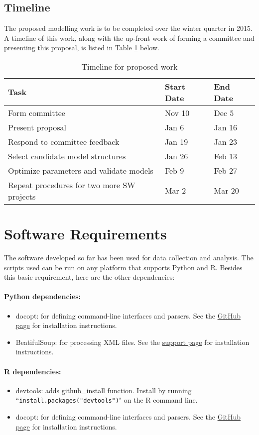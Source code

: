 \documentclass[a4paper]{scrartcl}
\begin{document}
\subsection{Timeline}
The proposed modelling work is to be completed over the winter quarter in 2015. A timeline of this work, along with the up-front work of forming a committee and presenting this proposal, is listed in Table \ref{tab:timeline} below.

\begin{table}[h]
\caption{Timeline for proposed work}
\centering
\begin{tabular}{ p{2.5in} l l}
\hline\hline
Task & Start Date & End Date \\
\hline
Form committee & Nov 10 & Dec 5 \\
Present proposal & Jan 6 & Jan 16 \\
Respond to committee feedback & Jan 19 & Jan 23 \\
Select candidate model structures & Jan 26 & Feb 13 \\
Optimize parameters and validate models & Feb 9 & Feb 27 \\
Repeat procedures for two more SW projects & Mar 2 & Mar 20 \\
\hline
\end{tabular}
\label{tab:timeline}
\end{table}

\appendix
\section{Software Requirements}
\label{sw_reqs}
The software developed so far has been used for data collection and analysis. The scripts used can be run on any platform that supports Python and R. Besides this basic requirement, here are the other dependencies:
\paragraph{Python dependencies:}
\begin{itemize}
\item
docopt: for defining command-line interfaces and parsers. See the \href{https://github.com/docopt/docopt}{GitHub page} for installation instructions.
\item
BeatifulSoup: for processing XML files. See the \href{http://www.crummy.com/software/BeautifulSoup}{support page} for installation instructions.
\end{itemize}

\paragraph{R dependencies:}
\begin{itemize}
\item
devtools: adds github\_install function. Install by running ``\verb|install.packages("devtools")|" on the R command line.
\item{docopt: for defining command-line interfaces and parsers. See the \href{https://github.com/edwindj/docopt.R}{GitHub page} for installation instructions.}
\end{itemize}




\end{document}
